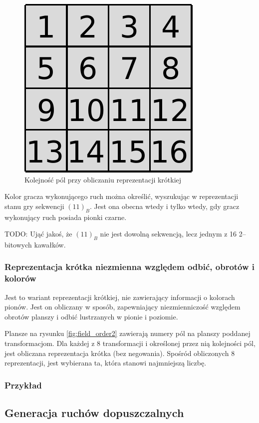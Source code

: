 \documentclass{scrartcl}
\begin{document}
\begin{figure}
  \centering
  \includegraphics{data/field_order.pdf}
  \caption{Kolejność pól przy obliczaniu reprezentacji krótkiej}
  \label{fig:field_order}
\end{figure}

Kolor gracza wykonującego ruch można określić, wyszukując w
reprezentacji stanu gry sekwencji $(11)_B$. Jest ona obecna wtedy i
tylko wtedy, gdy gracz wykonujący ruch posiada pionki czarne.

TODO: Ująć jakoś, że $(11)_B$ nie jest dowolną sekwencją, lecz jednym
z 16 2--bitowych kawałków.

\subsubsection{Reprezentacja krótka niezmienna względem odbić,
  obrotów i kolorów}
Jest to wariant reprezentacji krótkiej, nie zawierający informacji 
o kolorach pionów. Jest on obliczany w sposób, zapewniający 
niezmienniczość względem obrotów planszy i odbić lustrzanych w pionie
i poziomie. 

Plansze na rysunku \ref{fig:field_order2} zawierają numery pól na
planszy poddanej transformacjom. Dla każdej z 8 transformacji i
określonej przez nią kolejności pól, jest obliczana reprezentacja 
krótka (bez negowania). Spośród obliczonych 8 reprezentacji, 
jest wybierana ta, która stanowi najmniejszą liczbę.

\subsubsection{Przykład}

\subsection{Generacja ruchów dopuszczalnych}
\end{document}
